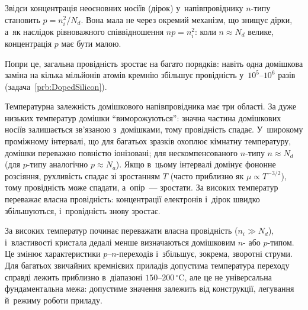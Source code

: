 Звідси концентрація неосновних носіїв (дірок) у~напівпровіднику $n$-типу становить
$p=n_i^2/N_d$. Вона мала не через окремий механізм, що знищує дірки, а~як наслідок
рівноважного співвідношення $np=n_i^2$: коли $n\approx N_d$ велике, концентрація $p$
має бути малою.

Попри це, загальна провідність зростає на багато порядків: навіть одна домішкова заміна на
кілька мільйонів атомів кремнію збільшує провідність у~$10^5$--$10^6$ разів
(задача~\ref{prb:DopedSilicon}).



Температурна залежність домішкового напівпровідника має три області. За дуже низьких
температур домішки \enquote{виморожуються}: значна частина домішкових носіїв залишається
зв'язаною з~домішками, тому провідність спадає. У~широкому проміжному інтервалі, що для
багатьох зразків охоплює кімнатну температуру, домішки переважно повністю іонізовані;
для нескомпенсованого $n$-типу $n\approx N_d$ (для $p$-типу аналогічно $p\approx N_a$).
Якщо в~цьому інтервалі домінує фононне розсіяння, рухливість спадає зі зростанням $T$
(часто приблизно як $\mu\propto T^{-3/2}$), тому провідність може спадати, а~опір~---
зростати. За високих температур переважає власна провідність: концентрації електронів
і~дірок швидко збільшуються, і~провідність знову зростає.

За високих температур починає переважати власна провідність ($n_i \gg N_d$), і~властивості
кристала дедалі менше визначаються домішковим $n$- або $p$-типом. Це змінює характеристики
$p$--$n$-переходів і~збільшує, зокрема, зворотні струми. Для багатьох звичайних кремнієвих
приладів допустима температура переходу справді лежить приблизно в~діапазоні
$150$--$200\, ^\circ\text{C}$, але це не універсальна фундаментальна межа: допустиме
значення залежить від конструкції, легування й~режиму роботи приладу.



